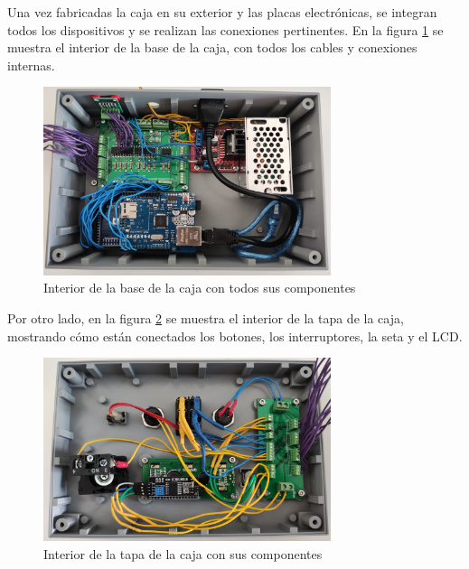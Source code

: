 Una vez fabricadas la caja en su exterior y las placas electrónicas, se integran todos 
los dispositivos y se realizan las conexiones pertinentes. En la figura \ref{fig:cajainterior}
se muestra el interior de la base de la caja, con todos los cables y conexiones internas.

\begin{figure}[hbtp]%
    \centering 
        \includegraphics[width=0.75\textwidth]{07-resultados/cajainterior.jpg}
    \caption{Interior de la base de la caja con todos sus componentes}
    \label{fig:cajainterior} 
\end{figure}

Por otro lado, en la figura \ref{fig:cajatapainterior} se muestra el interior de la tapa de la 
caja, mostrando cómo están conectados los botones, los interruptores, la seta y el LCD.

\begin{figure}[hbtp]
    \centering 
        \includegraphics[width=0.75\textwidth]{07-resultados/cajatapa.jpg}
    \caption{Interior de la tapa de la caja con sus componentes}
    \label{fig:cajatapainterior} 
\end{figure}
